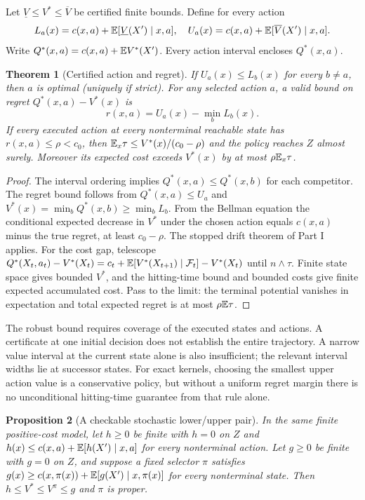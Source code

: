\documentclass[11pt]{article}
\newtheorem{theorem}{Theorem}[section]\newtheorem{proposition}[theorem]{Proposition}\newtheorem{lemma}[theorem]{Lemma}\newtheorem{corollary}[theorem]{Corollary}
\theoremstyle{definition}\newtheorem{definition}[theorem]{Definition}\newtheorem{example}[theorem]{Example}\newtheorem{conjecture}[theorem]{Conjecture}
\begin{document}
Let $\underline V\le V^*\le\overline V$ be certified finite bounds. Define for every action
\[L_a(x)=c(x,a)+\mathbb E[\underline V(X')\mid x,a],\quad U_a(x)=c(x,a)+\mathbb E[\overline V(X')\mid x,a].\]
Write $Q^*(x,a)=c(x,a)+\mathbb E V^*(X')$. Every action interval encloses $Q^*(x,a)$.
\begin{theorem}[Certified action and regret]\label{thm:action}
If $U_a(x)\le L_b(x)$ for every $b\ne a$, then $a$ is optimal (uniquely if strict). For any selected action $a$, a valid bound on regret $Q^*(x,a)-V^*(x)$ is
\[r(x,a)=U_a(x)-\min_b L_b(x).\]
If every executed action at every nonterminal reachable state has $r(x,a)\le\rho<c_0$, then $\mathbb E_x\tau\le V^*(x)/(c_0-\rho)$ and the policy reaches $Z$ almost surely. Moreover its expected cost exceeds $V^*(x)$ by at most $\rho\mathbb E_x\tau$.
\end{theorem}
\begin{proof} The interval ordering implies $Q^*(x,a)\le Q^*(x,b)$ for each competitor. The regret bound follows from $Q^*(x,a)\le U_a$ and $V^*(x)=\min_b Q^*(x,b)\ge\min_b L_b$. From the Bellman equation the conditional expected decrease in $V^*$ under the chosen action equals $c(x,a)$ minus the true regret, at least $c_0-\rho$. The stopped drift theorem of Part I applies. For the cost gap, telescope $Q^*(X_t,a_t)-V^*(X_t)=c_t+\mathbb E[V^*(X_{t+1})\mid\mathcal F_t]-V^*(X_t)$ until $n\wedge\tau$. Finite state space gives bounded $V^*$, and the hitting-time bound and bounded costs give finite expected accumulated cost. Pass to the limit: the terminal potential vanishes in expectation and total expected regret is at most $\rho\mathbb E\tau$.\end{proof}
The robust bound requires coverage of the executed states and actions. A certificate at one initial decision does not establish the entire trajectory. A narrow value interval at the current state alone is also insufficient; the relevant interval widths lie at successor states. For exact kernels, choosing the smallest upper action value is a conservative policy, but without a uniform regret margin there is no unconditional hitting-time guarantee from that rule alone.
\begin{proposition}[A checkable stochastic lower/upper pair]\label{prop:stoch}
In the same finite positive-cost model, let $h\ge0$ be finite with $h=0$ on $Z$ and $h(x)\le c(x,a)+\mathbb E[h(X')\mid x,a]$ for every nonterminal action. Let $g\ge0$ be finite with $g=0$ on $Z$, and suppose a fixed selector $\pi$ satisfies $g(x)\ge c(x,\pi(x))+\mathbb E[g(X')\mid x,\pi(x)]$ for every nonterminal state. Then $h\le V^*\le V^\pi\le g$ and $\pi$ is proper.
\end{proposition}
\end{document}
